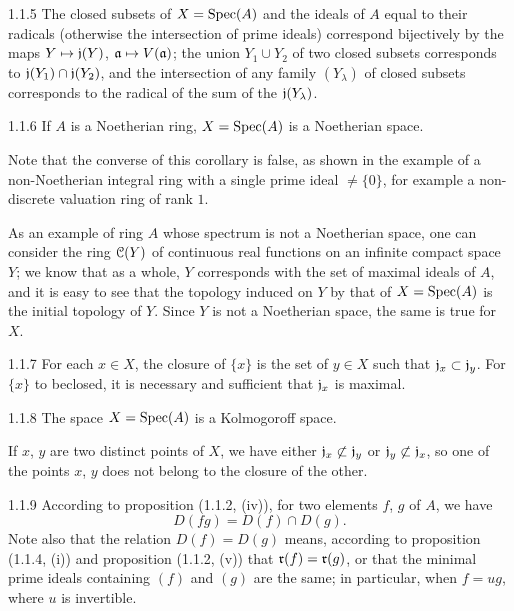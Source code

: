 \documentclass[../main.tex]{subfiles}
\begin{document}
\begin{cx}[Corollary]{1.1.5}
The closed subsets of $X=\operatorname{Spec}(A)$ and the ideals of $A$ equal to their radicals (otherwise the
intersection of prime ideals) correspond bijectively by the  maps $Y\mapsto\mathfrak{j}(Y)$,
$\mathfrak{a}\mapsto V(\mathfrak{a})$; the union $Y_1\cup Y_2$ of two closed subsets corresponds to
$\mathfrak{j}(Y_1)\cap\mathfrak{j}(Y_2)$, and the intersection of any family $(Y_\lambda)$ of closed subsets
corresponds to the radical of the sum of the $\mathfrak{j}(Y_\lambda)$.
\end{cx}

\begin{cx}[Corollary]{1.1.6}
If $A$ is a Noetherian ring, $X=\operatorname{Spec}(A)$ is a Noetherian space.
\end{cx}
Note that the converse of this corollary is false, as shown
in the example of a non-Noetherian integral ring with a single prime ideal $\neq\{0\}$, for
example a non-discrete valuation ring of rank $1$.

As an example of ring $A$ whose spectrum is not a Noetherian space, one
can consider the ring $\mathcal{C}(Y)$ of continuous real functions on an infinite compact space
$Y$; we know that as a whole, $Y$ corresponds with the set of maximal ideals
of $A$, and it is easy to see that the topology induced on $Y$ by that of $X=\operatorname{Spec}(A)$
is the initial topology of $Y$. Since $Y$ is not a Noetherian space, the same is true for $X$.

\begin{cx}[Corollary]{1.1.7}
For each $x\in X$, the closure of $\{x\}$ is the set of $y\in X$ such that $\mathfrak{j}_x\subset\mathfrak{j}_y$.
For $\{x\}$ to beclosed, it is necessary and sufficient that $\mathfrak{j}_x$ is maximal.
\end{cx}

\begin{cx}[Corollary]{1.1.8}
The space $X=\operatorname{Spec}(A)$ is a Kolmogoroff space.
\end{cx}

If $x$, $y$ are two distinct points of $X$, we have either $\mathfrak{j}_x\not\subset\mathfrak{j}_y$ or
$\mathfrak{j}_y\not\subset\mathfrak{j}_x$, so one of the points $x$, $y$ does not belong to the closure of the other.

\begin{cx}{1.1.9}
According to proposition (1.1.2, (iv)), for two elements $f$, $g$ of $A$, we have
\begin{equation}
  D(fg)=D(f)\cap D(g).\tag{1.1.9.1}
\end{equation}
Note also that the relation $D(f)=D(g)$ means, according to proposition (1.1.4, (i))
and proposition (1.1.2, (v)) that $\mathfrak{r}(f)=\mathfrak{r}(g)$, or that the minimal prime ideals
containing $(f)$ and $(g)$ are the same; in particular, when $f=ug$, where $u$ is invertible.
\end{cx}
\end{document}
